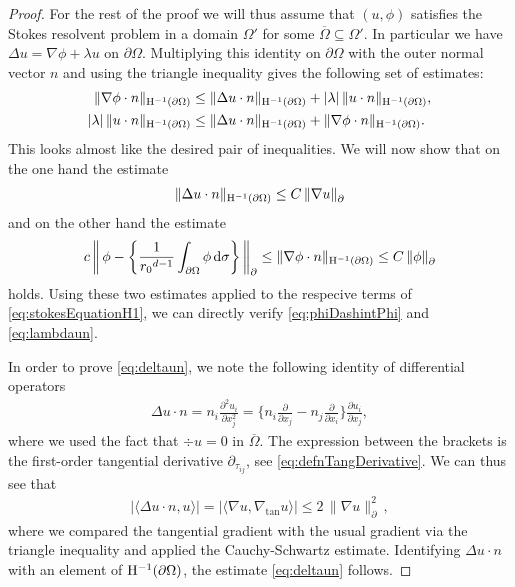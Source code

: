 \begin{proof}
  For the rest of the proof we will thus assume that $(u,\phi)$ satisfies the Stokes resolvent problem in a domain $\Omega'$ for some $\overline \Omega \subseteq \Omega'$.
  In particular we have $\Delta u = \nabla \phi + \lambda u$  on $\partial\Omega$.
  Multiplying this identity  on $\partial\Omega$ with the outer normal vector $n$ and using the triangle inequality gives the following set of estimates:
  \begin{align}
    \label{eq:stokesEquationH1}
    \begin{alignedat}{1}
    \|\nabla \phi \cdot n\|_{\mathrm{H}^{-1}(\partial\Omega)} 
    &\leq \|\Delta u \cdot n \|_{\mathrm{H}^{-1}(\partial\Omega)} + |\lambda|\, \| u\cdot n\|_{\mathrm{H}^{-1}(\partial\Omega)}, \\
    |\lambda|\, \| u\cdot n \|_{\mathrm{H}^{-1}(\partial\Omega)} 
    &\leq \|\Delta u \cdot n \|_{\mathrm{H}^{-1}(\partial\Omega)} + \|\nabla \phi \cdot n \|_{\mathrm{H}^{-1}(\partial\Omega)}.
    \end{alignedat}
  \end{align}
  This looks almost like the desired pair of inequalities.
  We will now show that on the one hand the estimate
  \begin{align}
    \label{eq:deltaun}
    \|\Delta u \cdot n\|_{\mathrm{H}^{-1}(\partial\Omega)}
    \leq C\, \|\nabla u\|^{}_\partial
  \end{align}
  and on the other hand the estimate
  \begin{align}
    \label{eq:nablaPhin}
    c \, \bigg\|\,\phi - \bigg\{ \frac{1}{{r_0}^{d - 1}}\int_{\partial\Omega} \phi \, {\operatorname{d}\!{\sigma}} \bigg\} \, \bigg\|^{}_\partial 
    \leq \|\nabla \phi \cdot n\|_{\mathrm{H}^{-1}(\partial\Omega)}
    \leq C\,  \|\phi\|^{}_\partial
  \end{align}
  holds.
  Using these two estimates applied to the respecive terms of \eqref{eq:stokesEquationH1}, we can directly verify \eqref{eq:phiDashintPhi} and \eqref{eq:lambdaun}.

  In order to prove \eqref{eq:deltaun}, we note the following identity of differential operators
  \begin{align*}
    \Delta u \cdot n = n_i \frac{\partial^2 u_i}{\partial x_j^2} = \Big\{ n_i \frac{\partial}{\partial x_j} - n_j \frac{\partial}{\partial x_i} \Big\} \frac{\partial u_i}{\partial x_j},
  \end{align*}
  where we used the fact that $\div u = 0$ in $\overline \Omega$.
  The expression between the brackets is the first-order tangential derivative $\partial_{\tau_{ij}}$, see \eqref{eq:defnTangDerivative}. 
  We can thus see that
  \begin{align*}
    \big| \langle \Delta u \cdot n, u \rangle \big| = \big| \langle \nabla u, \nabla_{\mathrm{tan}} u \rangle\big| \leq 2\, \|\nabla u\|_\partial^2\,,
  \end{align*}
  where we compared the tangential gradient with the usual gradient via the triangle inequality and applied the Cauchy-Schwartz estimate.  
  Identifying $\Delta u \cdot n$ with an element of $\mathrm{H}^{-1}(\partial\Omega)$, the estimate \eqref{eq:deltaun} follows. 


\end{proof}
